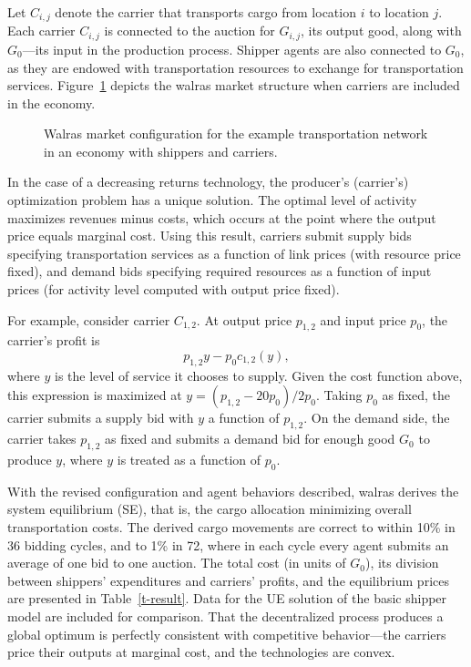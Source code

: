 Let $C_{i,j}$ denote the carrier that transports cargo from location $i$ 
to location $j$.
Each carrier $C_{i,j}$ is connected to the auction for $G_{i,j}$, its 
output good, along with $G_0$---its input in the production process.
Shipper agents are also connected to $G_0$, as they are endowed with 
transportation resources to exchange for 
transportation services.
Figure~\ref{fig:market1} depicts the {\sc walras} market structure
when carriers are included in the economy.

\begin{figure}[htbp]
\centerline{}
\caption{{\sc Walras} market configuration for the example
transportation network in an economy with shippers and carriers.}
\label{fig:market1}
\end{figure}

In the case of
a decreasing returns technology, the producer's (carrier's) optimization
problem has a unique solution. The optimal level of activity maximizes
revenues minus costs, which occurs at the point where the output
price equals marginal cost.  Using this result, carriers
submit supply bids specifying transportation services as a function of link
prices (with resource price fixed), and demand
bids specifying required resources as a function of input prices (for
activity level computed with output price fixed).

For example, consider carrier $C_{1,2}$.  At output price $p_{1,2}$ and 
input price $p_0$, the carrier's profit is
\begin{displaymath}
p_{1,2}y - p_0c_{1,2}(y),
\end{displaymath}
where $y$ is the level of service it chooses to supply.
Given the cost function above, this expression is maximized at 
$y=(p_{1,2}-20p_0)/2p_0$.
Taking $p_0$ as fixed, the carrier submits a supply bid with $y$ a 
function of $p_{1,2}$.  On the demand side, the carrier takes $p_{1,2}$ 
as fixed and submits a demand bid for enough good $G_0$ to produce $y$, 
where $y$ is treated as a function of $p_0$.

With the revised configuration and agent behaviors described, {\sc walras} 
derives the system equilibrium (SE), that is, the cargo allocation 
minimizing overall transportation costs.
The derived cargo movements are correct to within 10\% 
in 36 bidding cycles, and to 1\% in 72, where in each cycle every
agent submits an average of one bid to one auction.
The total cost (in units of $G_0$), its division between 
shippers' expenditures and carriers' profits, and the equilibrium
prices are presented in Table~\ref{t-result}.
Data for the UE solution of the basic shipper model are included for
comparison.
That the decentralized process produces a global optimum is perfectly 
consistent with competitive behavior---the carriers price
their outputs at marginal cost, and the technologies are convex.

